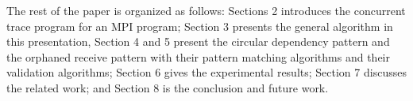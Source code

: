 
The rest of the paper is organized as follows: Sections 2 introduces the concurrent trace program for an MPI program; Section 3 presents the general algorithm in this presentation, Section 4 and 5 present the circular dependency pattern and the orphaned receive pattern with their pattern matching algorithms and their validation algorithms; Section 6 gives the experimental results; Section 7 discusses the related work; and Section 8 is the conclusion and future work.